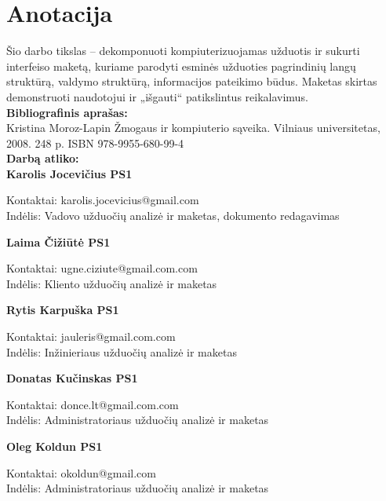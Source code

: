 

\newcommand{\anotacijaIndelis}[3]{
	\textbf{#1}
	\begin{flushleft}
	\hspace*{1cm}
	Kontaktai: #2
	\\
	\hspace*{1cm}
	Indėlis: #3
	\end{flushleft}
}

\newcommand{\anotacija}[2]{
	\textbf{#1}
	\begin{flushleft}
	\hspace*{1cm}
	Kontaktai: #2
	\end{flushleft}
}

\section*{Anotacija}

		Šio darbo tikslas – dekomponuoti kompiuterizuojamas užduotis ir sukurti interfeiso maketą, kuriame parodyti esminės užduoties pagrindinių langų struktūrą, valdymo struktūrą, informacijos pateikimo būdus. 
		Maketas skirtas demonstruoti naudotojui ir „išgauti“ patikslintus reikalavimus. \\
		
		\textbf{Bibliografinis aprašas:}\\
		Kristina Moroz-Lapin Žmogaus ir kompiuterio sąveika. Vilniaus universitetas, 2008. 248 p. ISBN 978-9955-680-99-4
		\\
		
		\textbf{Darbą atliko:}\\

		\anotacijaIndelis{Karolis Jocevičius PS1}{karolis.jocevicius@gmail.com}{Vadovo užduočių analizė ir maketas, dokumento redagavimas}
		
		\anotacijaIndelis{Laima Čižiūtė PS1}{ugne.ciziute@gmail.com.com}{Kliento užduočių analizė ir maketas}
		
		\anotacijaIndelis{Rytis Karpuška PS1}{jauleris@gmail.com.com}{Inžinieriaus užduočių analizė ir maketas}

		\anotacijaIndelis{Donatas Kučinskas PS1}{donce.lt@gmail.com.com}{Administratoriaus užduočių analizė ir maketas}

		\anotacijaIndelis{Oleg Koldun PS1}{okoldun@gmail.com}{Administratoriaus užduočių analizė ir maketas}